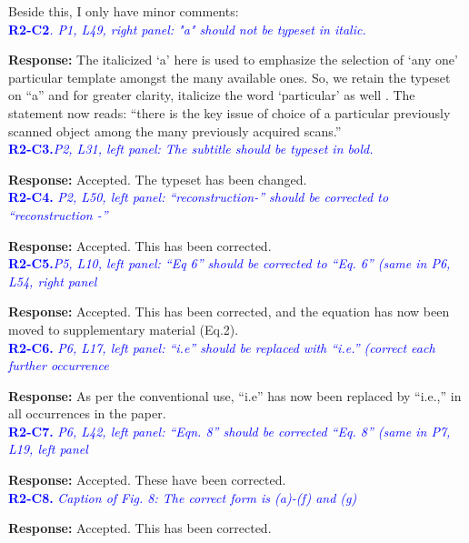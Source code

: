 \documentclass{article}
\begin{document}
Beside this, I only have minor comments:\\

\textcolor{blue}{\textbf{R2-C2}\textit{. P1, L49, right panel: "a" should not be typeset in italic.}}

\textbf{Response:} The italicized `a' here is used to emphasize the selection of `any one' particular template amongst the many available ones. So, we retain the typeset on ``a'' and for greater clarity, italicize the word `particular' as well . The statement now reads:
``there is the key issue of choice of a particular previously scanned object among the many previously acquired scans.''\\

\textcolor{blue}{\textbf{R2-C3.}\textit{P2, L31, left panel: The subtitle should be typeset in bold.}}

 \textbf{Response:} Accepted. The typeset has been changed.\\

\textcolor{blue}{\textbf{R2-C4. }\textit{P2, L50, left panel: ``reconstruction-'' should be corrected to ``reconstruction -''}}

 \textbf{Response:} Accepted. This has been corrected.\\

\textcolor{blue}{\textbf{R2-C5.}\textit{P5, L10, left panel: ``Eq 6'' should be corrected to ``Eq. 6'' (same in P6, L54, right panel}}

 \textbf{Response:} Accepted. This has been corrected, and the equation has now been moved to  supplementary material (Eq.2). \\

\textcolor{blue}{\textbf{R2-C6.}\textit{ P6, L17, left panel: ``i.e'' should be replaced with ``i.e.'' (correct each further occurrence}}

 \textbf{Response:} As per the conventional use, ``i.e'' has now been replaced by ``i.e.,'' in all occurrences in the paper.\\

\textcolor{blue}{\textbf{R2-C7. }\textit{P6, L42, left panel: ``Eqn. 8'' should be corrected ``Eq. 8'' (same in P7, L19, left panel}}

  \textbf{Response:} Accepted. These have been corrected.\\
 
 \textcolor{blue}{\textbf{R2-C8.}\textit{ Caption of Fig. 8: The correct form is (a)-(f) and (g)}}

  \textbf{Response:} Accepted. This has been corrected.\\
 
\end{document}
